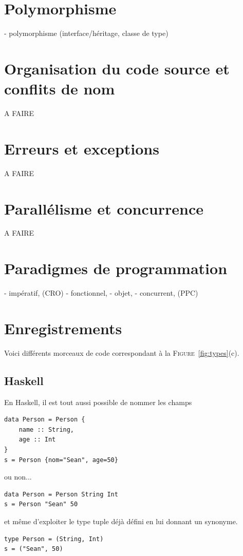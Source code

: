 \documentclass[a4paper,francais]{insalyon}
\begin{document}
\section{Polymorphisme}

- polymorphisme (interface/héritage, classe de type)

\section{Organisation du code source et conflits de nom}

A FAIRE

\section{Erreurs et exceptions}

A FAIRE

\section{Parallélisme et concurrence}

A FAIRE

\section{Paradigmes de programmation}

- impératif, (CRO)
- fonctionnel, 
- objet, 
- concurrent, (PPC)

\appendix
\section{Enregistrements}
\label{a:enregistrement}

Voici différents morceaux de code correspondant à la \textsc{Figure}~\ref{fig:types}(c).

\subsection{Haskell}

En Haskell, il est tout aussi possible de nommer les champs
\begin{verbatim}
data Person = Person {
    name :: String, 
    age :: Int
}
s = Person {nom="Sean", age=50}
\end{verbatim}
ou non...
\begin{verbatim}
data Person = Person String Int
s = Person "Sean" 50
\end{verbatim}
et même d'exploiter le type tuple déjà défini en lui donnant un synonyme.
\begin{verbatim}
type Person = (String, Int)
s = ("Sean", 50)
\end{verbatim}
\end{document}
